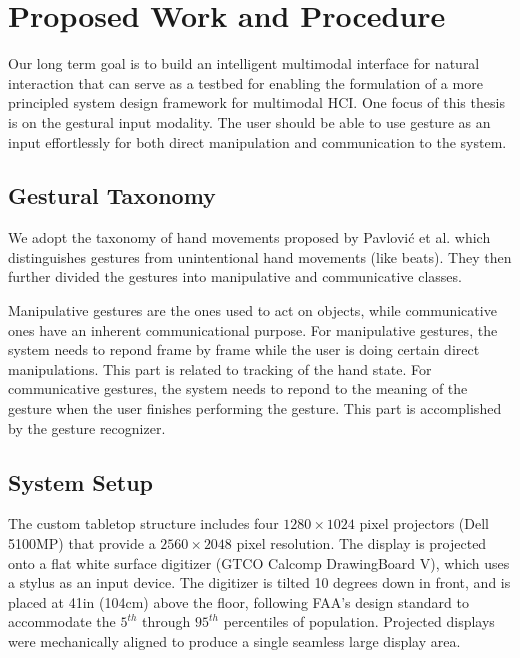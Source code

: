 \section{Proposed Work and Procedure}
Our long term goal is to build an intelligent multimodal interface for natural
interaction that can serve as a testbed for enabling the formulation of a more
principled system design framework for multimodal HCI. One focus of this thesis
is on the gestural input modality. The user should be able to use gesture as an
input effortlessly for both direct manipulation and communication to the system.

\subsection{Gestural Taxonomy}
We adopt the taxonomy of hand movements proposed by Pavlovi\'{c} et al.
\cite{Pavlovic97} which distinguishes gestures from unintentional hand movements
(like beats). They then further divided the gestures into manipulative and 
communicative classes. 

Manipulative gestures are the ones used to act on objects, while communicative 
ones have an inherent communicational purpose\cite{Pavlovic97}. For manipulative
gestures, the system needs to repond frame by frame while the user is doing
certain direct manipulations. This part is related to tracking of the hand
state. For communicative gestures, the system needs to repond to the meaning of
the gesture when the user finishes performing the gesture. This part is
accomplished by the gesture recognizer.

\subsection{System Setup}
The custom tabletop structure includes four $1280\times1024$ pixel projectors 
(Dell 5100MP) that provide a $2560\times2048$ pixel resolution. The display is 
projected onto a flat white surface digitizer (GTCO Calcomp DrawingBoard V), 
which uses a stylus as an input device. The digitizer is tilted 10 degrees down 
in front, and is placed at 41in (104cm) above the floor, following FAA's design 
standard to accommodate the $5^{th}$ through $95^{th}$ percentiles of 
population. Projected displays were mechanically aligned to produce a single 
seamless large display area.

